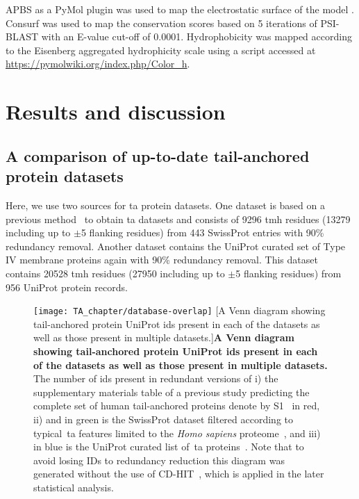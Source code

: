 APBS as a PyMol plugin was used to map the electrostatic surface of the model \cite{Baker2001}.
Consurf \cite{Ashkenazy2010} was used to map the conservation scores based on 5 iterations of PSI-BLAST \cite{Altschul1997} with an E-value cut-off of 0.0001.
Hydrophobicity was mapped according to the Eisenberg aggregated hydrophicity scale \cite{Eisenberg1984} using a script accessed at \url{https://pymolwiki.org/index.php/Color_h}.


\section{Results and discussion}

\subsection{A comparison of up-to-date tail-anchored protein datasets}
Here, we use two sources for \gls{ta} protein datasets.
One dataset is based on a previous method~\cite{Kalbfleisch2007} to obtain \gls{ta} datasets and consists of 9296 \gls{tmh} residues (13279 including up to $\pm$5 flanking residues) from 443 SwissProt entries with 90\% redundancy removal.
Another dataset contains the UniProt curated set of Type IV membrane proteins again with 90\% redundancy removal.
This dataset contains 20528 \gls{tmh} residues (27950 including up to $\pm$5 flanking residues) from 956 UniProt protein records.

\begin{figure}
\centering
\texttt{[image: TA\_chapter/database-overlap]}
        [A Venn diagram showing tail-anchored protein UniProt ids present in each of the datasets as well as those present in multiple datasets.]{\textbf{A Venn diagram showing tail-anchored protein UniProt ids present in each of the datasets as well as those present in multiple datasets.}
The number of ids present in redundant versions of
i) the supplementary materials table of a previous study predicting the complete set of human tail-anchored proteins denote by S1~\cite{Kalbfleisch2007} in red,
ii) and in green is the SwissProt dataset filtered according to typical~\gls{ta} features limited to the \textit{Homo sapiens} proteome~\cite{TheUniProtConsortium2014}, and
iii) in blue is the UniProt curated list of~\gls{ta} proteins~\cite{TheUniProtConsortium2014}.
Note that to avoid losing IDs to redundancy reduction this diagram was generated without the use of CD-HIT~\cite{Huang2010, Wu2011}, which is applied in the later statistical analysis.}

\label{fig:tadatasetoverlap}
\end{figure}

